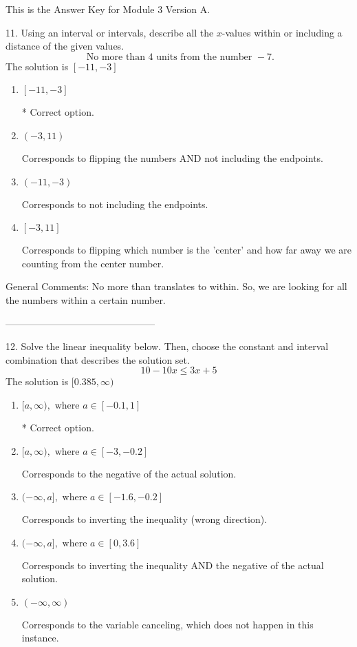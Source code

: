 \documentclass{article}[10pt]
\begin{document}
This is the Answer Key for Module 3 Version A.

11. Using an interval or intervals, describe all the $x$-values within or including a distance of the given values.
$$ \text{ No more than } 4 \text{ units from the number } -7. $$ 
The solution is $ [-11, -3] $ 

\begin{enumerate}[label=\Alph*.] 
\item $ [-11, -3] $ 

 * Correct option. 
\item $ (-3, 11) $ 

 Corresponds to flipping the numbers AND not including the endpoints. 
\item $ (-11, -3) $ 

 Corresponds to not including the endpoints. 
\item $ [-3, 11] $ 

 Corresponds to flipping which number is the 'center' and how far away we are counting from the center number. 
\end{enumerate} 
 
General Comments: No more than translates to within. So, we are looking for all the numbers within a certain number.

-----------------------------------------------

12. Solve the linear inequality below. Then, choose the constant and interval combination that describes the solution set.
$$ 10 - 10 x \leq 3 x + 5 $$ 
The solution is $ [0.385, \infty) $ 

\begin{enumerate}[label=\Alph*.] 
\item $ [a, \infty), \text{ where } a \in [-0.1, 1] $ 

  * Correct option. 
\item $ [a, \infty), \text{ where } a \in [-3, -0.2] $ 

 Corresponds to the negative of the actual solution. 
\item $ (-\infty, a], \text{ where } a \in [-1.6, -0.2] $ 

 Corresponds to inverting the inequality (wrong direction). 
\item $ (-\infty, a], \text{ where } a \in [0, 3.6] $ 

 Corresponds to inverting the inequality AND the negative of the actual solution. 
\item $ (-\infty, \infty) $ 

 Corresponds to the variable canceling, which does not happen in this instance. 
\end{enumerate} 
 
\end{document}
